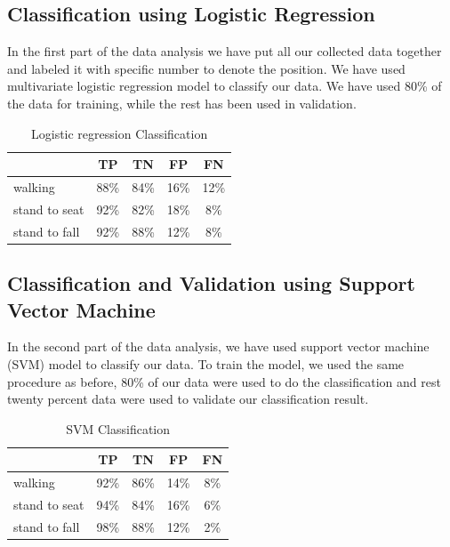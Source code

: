\documentclass[letterpaper]{article}
\begin{document}
\subsection{Classification using Logistic Regression}

In the first part of the data analysis we have put all our collected data together and labeled it
with specific number to denote the position. We have used multivariate logistic regression model to
classify our data. We have used 80\% of the data for training, while the rest has been used
in validation.


\begin{table}[!ht]
\caption{Logistic regression Classification}
	\label{tab:human-logistic-class}
	\centering
		\begin{tabular} {l |c |c |c|c}
			&TP  &	TN  &	FP &	FN \\ \hline
			walking	& 88\%	& 84\%	& 16\%	& 12\% \\ \hline
			stand to seat	& 92\%	& 82\%	& 18\% & 	8\%	 \\ \hline 
			stand to fall	& 92\%	& 88\%	& 12\%	& 8\%	 \\ \hline
		\end{tabular}
\end{table}




\subsection{Classification and Validation using Support Vector Machine}

In the second part of the data analysis, we have used support vector machine (SVM) model
to classify our data. To train the model, we used the same procedure as before, 80\% of
our data were used to do the classification and rest twenty percent data were used to validate our
classification result.




\begin{table}[!ht]
\caption{SVM Classification}
	\label{tab:human-svm-class}
	\centering
		\begin{tabular} {l |c |c |c|c}
			&TP  &	TN  &	FP &	FN \\ \hline
			walking	& 92\%	& 86\%	& 14\%	& 8\% \\ \hline
			stand to seat	& 94\%	& 84\%	& 16\% & 	6\%	 \\ \hline 
			stand to fall	& 98\%	& 88\%	& 12\%	& 2\%	 \\ \hline
		\end{tabular}
\end{table}
\end{document}
